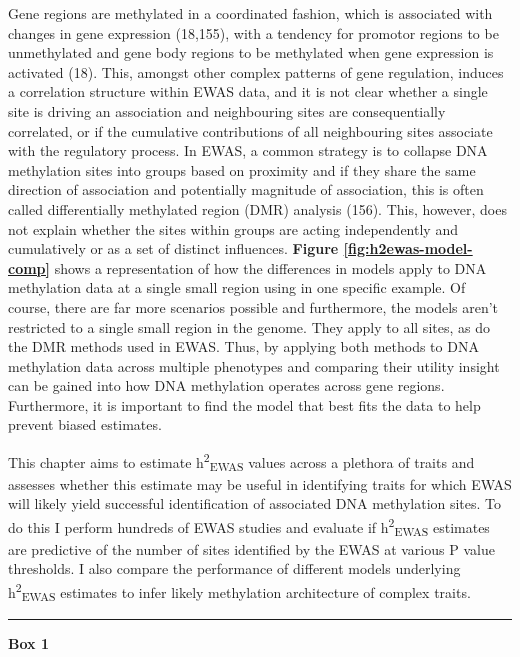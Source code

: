\documentclass[11pt,oneside]{bristolthesis}
\begin{document}
Gene regions are methylated in a coordinated fashion, which is associated with changes in gene expression (18,155), with a tendency for promotor regions to be unmethylated and gene body regions to be methylated when gene expression is activated (18). This, amongst other complex patterns of gene regulation, induces a correlation structure within EWAS data, and it is not clear whether a single site is driving an association and neighbouring sites are consequentially correlated, or if the cumulative contributions of all neighbouring sites associate with the regulatory process. In EWAS, a common strategy is to collapse DNA methylation sites into groups based on proximity and if they share the same direction of association and potentially magnitude of association, this is often called differentially methylated region (DMR) analysis (156). This, however, does not explain whether the sites within groups are acting independently and cumulatively or as a set of distinct influences. \textbf{Figure \ref{fig:h2ewas-model-comp}} shows a representation of how the differences in models apply to DNA methylation data at a single small region using in one specific example. Of course, there are far more scenarios possible and furthermore, the models aren't restricted to a single small region in the genome. They apply to all sites, as do the DMR methods used in EWAS. Thus, by applying both methods to DNA methylation data across multiple phenotypes and comparing their utility insight can be gained into how DNA methylation operates across gene regions. Furthermore, it is important to find the model that best fits the data to help prevent biased estimates.

This chapter aims to estimate h\textsuperscript{2}\textsubscript{EWAS} values across a plethora of traits and assesses whether this estimate may be useful in identifying traits for which EWAS will likely yield successful identification of associated DNA methylation sites. To do this I perform hundreds of EWAS studies and evaluate if h\textsuperscript{2}\textsubscript{EWAS} estimates are predictive of the number of sites identified by the EWAS at various P value thresholds. I also compare the performance of different models underlying h\textsuperscript{2}\textsubscript{EWAS} estimates to infer likely methylation architecture of complex traits.
\begin{center}\rule{0.5\linewidth}{0.5pt}\end{center}

\textbf{Box 1}
\end{document}
